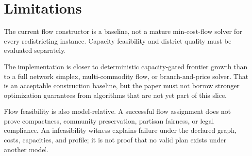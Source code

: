 \section{Limitations}

The current flow constructor is a baseline, not a mature min-cost-flow solver
for every redistricting instance. Capacity feasibility and district quality
must be evaluated separately.

The implementation is closer to deterministic capacity-gated frontier growth
than to a full network simplex, multi-commodity flow, or branch-and-price
solver. That is an acceptable construction baseline, but the paper must not
borrow stronger optimization guarantees from algorithms that are not yet part
of this slice.

Flow feasibility is also model-relative. A successful flow assignment does not
prove compactness, community preservation, partisan fairness, or legal
compliance. An infeasibility witness explains failure under the declared graph,
costs, capacities, and profile; it is not proof that no valid plan exists under
another model.
